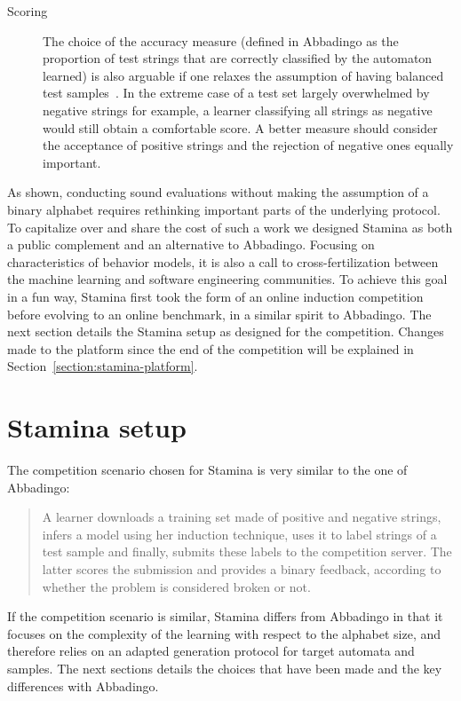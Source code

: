 \begin{description}
\item[Scoring] The choice of the accuracy measure (defined in Abbadingo as the proportion of test strings that are correctly classified by the automaton learned) is also arguable if one relaxes the assumption of having balanced test samples~\cite{Walkinshaw:2008}. In the extreme case of a test set largely overwhelmed by negative strings for example, a learner classifying all strings as negative would still obtain a comfortable score. A better measure should consider the acceptance of positive strings and the rejection of negative ones equally important. 
\end{description}

As shown, conducting sound evaluations without making the assumption of a binary alphabet requires rethinking important parts of the underlying protocol. To capitalize over and share the cost of such a work we designed Stamina as both a public complement and an alternative to Abbadingo. Focusing on characteristics of behavior models, it is also a call to cross-fertilization between the machine learning and software engineering communities. To achieve this goal in a fun way, Stamina first took the form of an online induction competition before evolving to an online benchmark, in a similar spirit to Abbadingo. The next section details the Stamina setup as designed for the competition. Changes made to the platform since the end of the competition will be explained in Section~\ref{section:stamina-platform}.


\section{Stamina setup\label{section:stamina-setup}}

The competition scenario chosen for Stamina is very similar to the one of Abbadingo: 

\begin{quotation}
A learner downloads a training set made of positive and negative strings, infers a model using her induction technique, uses it to label strings of a test sample and finally, submits these labels to the competition server. The latter scores the submission and provides a binary feedback, according to whether the problem is considered broken or not.
\end{quotation}

If the competition scenario is similar, Stamina differs from Abbadingo in that it focuses on the complexity of the learning with respect to the alphabet size, and therefore relies on an adapted generation protocol for target automata and samples. The next sections details the choices that have been made and the key differences with Abbadingo.


